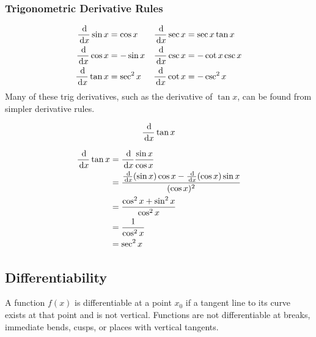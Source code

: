 \subsubsection{Trigonometric Derivative Rules}
\begin{align}
  \frac{\,\mathrm{d}}{\,\mathrm{d} x} \sin x &= \cos x & \frac{\,\mathrm{d}}{\,\mathrm{d} x} \sec x &= \sec x \tan x \\
  \frac{\,\mathrm{d}}{\,\mathrm{d} x} \cos x &= -\sin x & \frac{\,\mathrm{d}}{\,\mathrm{d} x} \csc x &= -\cot x \csc x \\
  \frac{\,\mathrm{d}}{\,\mathrm{d} x} \tan x &= \sec^2 x & \frac{\,\mathrm{d}}{\,\mathrm{d} x} \cot x &= -\csc^2 x
  \label{trigderiv}
\end{align}
Many of these trig derivatives, such as the derivative of $\tan x$, can be found from simpler derivative rules.
\begin{ex}
  \[\frac{\,\mathrm{d}}{\,\mathrm{d} x} \tan x\]
  \begin{sol}
    \begin{align*}
      \frac{\,\mathrm{d}}{\,\mathrm{d} x} \tan x &= \frac{\,\mathrm{d}}{\,\mathrm{d} x} \frac{\sin x}{\cos x} \\
      &= \frac{\frac{\,\mathrm{d}}{\,\mathrm{d} x} (\sin x) \cos x - \frac{\,\mathrm{d}}{\,\mathrm{d} x} (\cos x) \sin x}{(\cos x)^2}\\
      &=\frac{\cos^2 x+\sin^2 x}{\cos^2 x}\\
      &=\frac{1}{\cos^2 x}\\
      &=\sec^2 x
    \end{align*}
  \end{sol}
\end{ex}
\subsection{Differentiability}
  A function $f(x)$ is differentiable at a point $x_0$ if a tangent line to its curve exists at that point and is not vertical. Functions are not differentiable at breaks, immediate bends, cusps, or places with vertical tangents.

